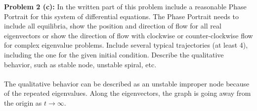 \documentclass[12pt]{article}
\begin{document}
\vspace{\baselineskip}
\vspace{\baselineskip}
\vspace{\baselineskip}

\noindent \textbf{Problem 2 (c): }In the written part of this problem include a reasonable Phase Portrait for this system of differential equations. The Phase Portrait needs to include all equilibria, show the position and direction of flow for all real eigenvectors or show the direction of flow with clockwise or counter-clockwise flow for complex eigenvalue problems. Include several typical trajectories (at least 4), including the one for the given initial condition. Describe the qualitative behavior, such as stable node, unstable spiral, etc.
\\ \\
The qualitative behavior can be described as an unstable improper node because of the repeated eigenvalues. Along the eigenvectors, the graph is going away from the origin as $t \rightarrow \infty$.

\newpage 
\end{document}

